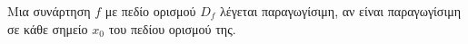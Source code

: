 Μια συνάρτηση $ f $ με πεδίο ορισμού $ D_f $ λέγεται παραγωγίσιμη, αν είναι παραγωγίσιμη σε κάθε σημείο $ x_0 $ του πεδίου ορισμού της.
